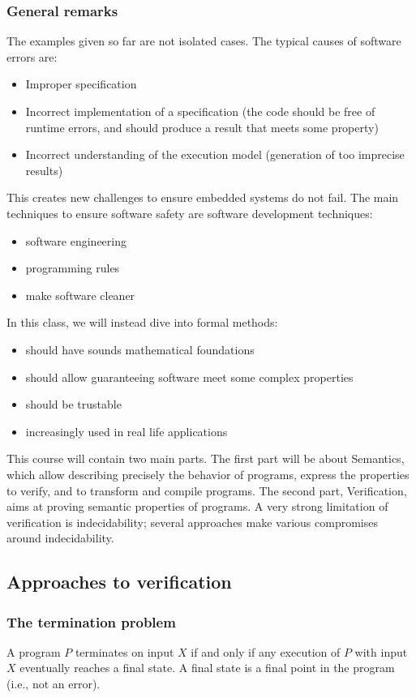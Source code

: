 \documentclass[toc]{../cs-classes/cs-classes}
\begin{document}
\subsubsection{General remarks}
The examples given so far are not isolated cases. The typical causes of software errors are:
\begin{itemize}
    \item Improper specification
    \item Incorrect implementation of a specification (the code should be free of runtime errors, and should produce a result that meets some property)
    \item Incorrect understanding of the execution model (generation of too imprecise results)
\end{itemize}

This creates new challenges to ensure embedded systems do not fail. The main techniques to ensure software safety are software development techniques:
\begin{itemize}
    \item software engineering
    \item programming rules
    \item make software cleaner
\end{itemize}

In this class, we will instead dive into formal methods:
\begin{itemize}
    \item should have sounds mathematical foundations
    \item should allow guaranteeing software meet some complex properties
    \item should be trustable
    \item increasingly used in real life applications
\end{itemize}

This course will contain two main parts. The first part will be about Semantics, which allow describing precisely the behavior of programs, express the properties to verify, and to transform and compile programs. The second part, Verification, aims at proving semantic properties of programs. A very strong limitation of verification is indecidability; several approaches make various compromises around indecidability.

\subsection{Approaches to verification}
\subsubsection{The termination problem}
\begin{definition}[Termination]
    A program $P$ terminates on input $X$ if and only if any execution of $P$ with input $X$ eventually reaches a final state. A final state is a final point in the program (i.e., not an error).
\end{definition}
\end{document}
